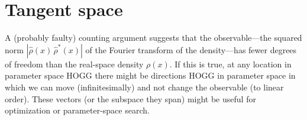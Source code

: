 \documentclass[12pt]{article}
\begin{document}
\section{Tangent space}

A (probably faulty) counting argument suggests that the
observable---the squared norm $|\hat{\rho}(x)\,\hat{\rho}^{\ast}(x)|$
of the Fourier transform of the density---has fewer degrees of freedom
than the real-space density $\rho(x)$.
If this is true, at any location in parameter space HOGG there might
be directions HOGG in parameter space in which we can move
(infinitesimally) and not change the observable (to linear order).
These vectors (or the subspace they span) might be useful for
optimization or parameter-space search.
\end{document}
